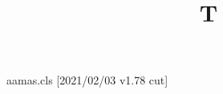 \begin{filecontents*}[overwrite]{aamas.cls}
[2021/02/03 v1.78 cut]
\end{filecontents*}
\documentclass[sigconf]{aamas}

\title{T}
\maketitle
Text \cite{a}.
\providecommand{\doi}[1]{doi: #1}
\begin{thebibliography}{1}
 A. Author. Title. \doi{10.1145/12345}.
\end{thebibliography}

